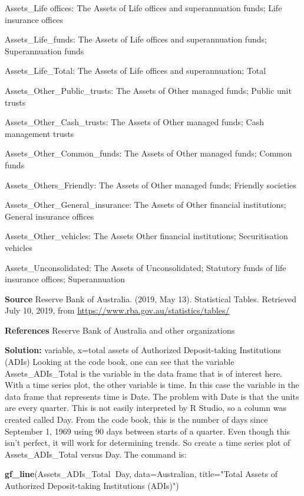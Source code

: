 \documentclass[]{book}
\newenvironment{Shaded}{\begin{snugshade}}{\end{snugshade}}
\newcommand{\DataTypeTok}[1]{\textcolor[rgb]{0.13,0.29,0.53}{#1}}
\newcommand{\KeywordTok}[1]{\textcolor[rgb]{0.13,0.29,0.53}{\textbf{#1}}}
\newcommand{\NormalTok}[1]{#1}
\newcommand{\OperatorTok}[1]{\textcolor[rgb]{0.81,0.36,0.00}{\textbf{#1}}}
\newcommand{\StringTok}[1]{\textcolor[rgb]{0.31,0.60,0.02}{#1}}
\begin{document}
Assets\_Life offices: The Assets of Life offices and superannuation funds; Life insurance offices

Assets\_Life\_funds: The Assets of Life offices and superannuation funds; Superannuation funds

Assets\_Life\_Total: The Assets of Life offices and superannuation; Total

Assets\_Other\_Public\_trusts: The Assets of Other managed funds; Public unit trusts

Assets\_Other\_Cash\_trusts: The Assets of Other managed funds; Cash management trusts

Assets\_Other\_Common\_funds: The Assets of Other managed funds; Common funds

Assets\_Others\_Friendly: The Assets of Other managed funds; Friendly societies

Assets\_Other\_General\_insurance: The Assets of Other financial institutions; General insurance offices

Assets\_Other\_vehicles: The Assets Other financial institutions; Securitisation vehicles

Assets\_Unconsolidated: The Assets of Unconsolidated; Statutory funds of life insurance offices; Superannuation

\textbf{Source}
Reserve Bank of Australia. (2019, May 13). Statistical Tables. Retrieved July 10, 2019, from \url{https://www.rba.gov.au/statistics/tables/}

\textbf{References}
Reserve Bank of Australia and other organizations

\textbf{Solution:}
variable, x=total assets of Authorized Deposit-taking Institutions (ADIs)
Looking at the code book, one can see that the variable Assets\_ADIs\_Total is the variable in the data frame that is of interest here. With a time series plot, the other variable is time. In this case the variable in the data frame that represents time is Date. The problem with Date is that the units are every quarter. This is not easily interpreted by R Studio, so a column was created called Day. From the code book, this is the number of days since September 1, 1969 using 90 days between starts of a quarter. Even though this isn't perfect, it will work for determining trends. So create a time series plot of Assets\_ADIs\_Total versus Day. The command is:



\begin{Shaded}
\begin{Highlighting}[]
\KeywordTok{gf_line}\NormalTok{(Assets_ADIs_Total}\OperatorTok{~}\NormalTok{Day, }\DataTypeTok{data=}\NormalTok{Australian, }\DataTypeTok{title=}\StringTok{"Total Assets of Authorized Deposit-taking Institutions (ADIs)"}\NormalTok{)}
\end{Highlighting}
\end{Shaded}
\end{document}
